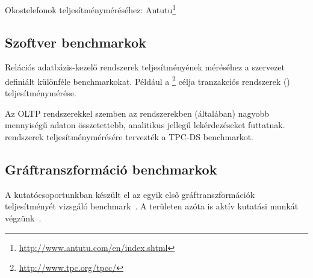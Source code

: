 Okostelefonok teljesítményméréséhez: Antutu\footnote{\url{http://www.antutu.com/en/index.shtml}}

\subsection{Szoftver benchmarkok}

Relációs adatbázis-kezelő rendszerek teljesítményének méréséhez a  szervezet definiált különféle benchmarkokat. Például a \footnote{\url{http://www.tpc.org/tpcc/}} célja tranzakciós rendszerek () teljesítménymérése.

\begin{megjegyzes}
Az OLTP rendszerekkel szemben az  rendszerekben (általában) nagyobb mennyiségű adaton összetettebb, analitikus jellegű lekérdezéseket futtatnak.  rendszerek teljesítménymérésére tervezték a \mbox{TPC-DS} benchmarkot.
\end{megjegyzes}


\subsection{Gráftranszformáció benchmarkok}

A kutatócsoportunkban készült el az egyik első gráftranszformációk teljesítményét vizsgáló benchmark~\cite{vlhcc05_vsv}. A területen azóta is aktív kutatási munkát végzünk~\cite{DBLP:conf/staf/SzarnyasSRV15}.

